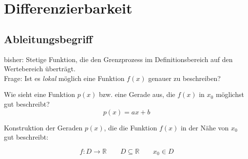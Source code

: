 \newpage
{}
\section{Differenzierbarkeit}
\subsection{Ableitungsbegriff}

bisher: Stetige Funktion, die den Grenzprozess im Definitionsbereich auf den Wertebereich überträgt.\\
Frage: Ist es \emph{lokal} möglich eine Funktion \( f(x) \) genauer zu beschreiben? 

Wie sieht eine Funktion \( p(x) \) bzw. eine Gerade aus, die \( f(x) \) in \( x_0 \) möglichst gut beschreibt?
\[
p(x)=ax+b 
\]
\begin{center}
  \centering
{}
  \label{fig:Approximierung}
\end{center}

\noindent Konstruktion der Geraden \( p(x) \), die die Funktion \( f(x) \) in der Nähe von \( x_0 \) gut beschreibt:

\[
	f:D\rightarrow\mathbb{R} \qquad D\subseteq\mathbb{R} \qquad x_0 \in D
\]

